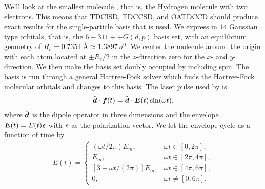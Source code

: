         We'll look at the smallest molecule , that is, the Hydrogen
        molecule with two electrons.
        This means that TDCISD, TDCCSD, and OATDCCD should produce exact
        results for the single-particle basis that is used.
        We express  in $14$ Gaussian type orbitals, that is, the
        $6-311++G(d, p)$ basis set, with an equilibrium geometry of $R_e =
        \SI{0.7354}{\angstrom} \approx \SI{1.3897}{\bohr}$.
        We center the molecule around the origin with each atom located at
        $\pm R_e/2$ in the $z$-direction zero for the $x$- and
        $y$-direction.
        We then make the basis set doubly occupied by including spin.
        The basis is run through a general Hartree-Fock solver which finds
        the Hartree-Fock molecular orbitals and changes to this basis.
        The laser pulse used by \citeauthor{li_2005} is
        \begin{align}
            \hat{\boldsymbol{d}} \cdot \boldsymbol{f}(t)
            = \hat{\boldsymbol{d}} \cdot \boldsymbol{E}(t)\sin(\omega t),
            \label{eq:li-field}
        \end{align}
        where $\hat{\boldsymbol{d}}$ is the dipole operator in three dimensions and
        the envelope $\boldsymbol{E}(t) = E(t)\boldsymbol{\epsilon}$ with $\boldsymbol{\epsilon}$
        as the polarization vector.
        We let the envelope cycle as a function of time by
        \begin{align}
            E(t) = \begin{cases}
                (\omega t / 2\pi) E_m, & \omega t \in [0, 2\pi], \\
                E_m, & \omega t \in [2\pi, 4\pi], \\
                [3 - \omega t / (2\pi)] E_m, & \omega t \in [4\pi, 6\pi], \\
                0, & \omega t \neq [0, 6\pi],
            \end{cases}
            \label{eq:li-laser}
        \end{align}

